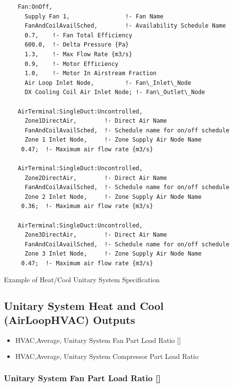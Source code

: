 \begin{lstlisting}
    Fan:OnOff,
      Supply Fan 1,                !- Fan Name
      FanAndCoilAvailSched,        !- Availability Schedule Name
      0.7,    !- Fan Total Efficiency
      600.0,  !- Delta Pressure {Pa}
      1.3,    !- Max Flow Rate {m3/s}
      0.9,    !- Motor Efficiency
      1.0,    !- Motor In Airstream Fraction
      Air Loop Inlet Node,         !- Fan\_Inlet\_Node
      DX Cooling Coil Air Inlet Node; !- Fan\_Outlet\_Node

    AirTerminal:SingleDuct:Uncontrolled,
      Zone1DirectAir,        !- Direct Air Name
      FanAndCoilAvailSched,  !- Schedule name for on/off schedule
      Zone 1 Inlet Node,     !- Zone Supply Air Node Name
     0.47;  !- Maximum air flow rate {m3/s}

    AirTerminal:SingleDuct:Uncontrolled,
      Zone2DirectAir,        !- Direct Air Name
      FanAndCoilAvailSched,  !- Schedule name for on/off schedule
      Zone 2 Inlet Node,     !- Zone Supply Air Node Name
     0.36;  !- Maximum air flow rate {m3/s}

    AirTerminal:SingleDuct:Uncontrolled,
      Zone3DirectAir,        !- Direct Air Name
      FanAndCoilAvailSched,  !- Schedule name for on/off schedule
      Zone 3 Inlet Node,     !- Zone Supply Air Node Name
     0.47;  !- Maximum air flow rate {m3/s}
\end{lstlisting}

Example of Heat/Cool Unitary System Specification

\subsection{Unitary System Heat and Cool (AirLoopHVAC) Outputs}\label{unitary-system-heat-and-cool-airloophvac-outputs}

\begin{itemize}
\item
  HVAC,Average, Unitary System Fan Part Load Ratio {[]}
\item
  HVAC,Average, Unitary System Compressor Part Load Ratio
\end{itemize}

\subsubsection{\texorpdfstring{Unitary System Fan Part Load Ratio {[]}}{Unitary System Fan Part Load Ratio }}\label{unitary-system-fan-part-load-ratio-2}

